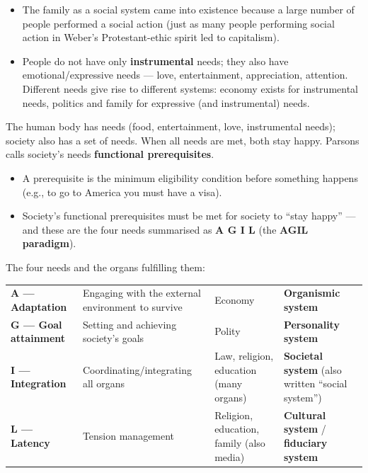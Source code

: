 \begin{ExampleBox}
\begin{itemize}
\item The family as a social system came into existence because a large number of people performed a social action (just as many people performing social action in Weber's Protestant-ethic spirit led to capitalism).
\item People do not have only \textbf{instrumental} needs; they also have emotional/expressive needs --- love, entertainment, appreciation, attention. Different needs give rise to different systems: economy exists for instrumental needs, politics and family for expressive (and instrumental) needs.
\end{itemize}
\end{ExampleBox}

The human body has needs (food, entertainment, love, instrumental needs); society also has a set of needs. When all needs are met, both stay happy. Parsons calls society's needs \textbf{functional prerequisites}.

\begin{KeyConcept}
\begin{itemize}
\item A prerequisite is the minimum eligibility condition before something happens (e.g., to go to America you must have a visa).
\item Society's functional prerequisites must be met for society to ``stay happy'' --- and these are the four needs summarised as \textbf{A G I L} (the \textbf{AGIL paradigm}).
\end{itemize}
\end{KeyConcept}

The four needs and the organs fulfilling them:

\begin{center}
\begin{tabularx}{\textwidth}{p{3.2cm} p{4.2cm} p{3.2cm} Y}
 &  &  &  \\
\midrule
\textbf{A --- Adaptation} & Engaging with the external environment to survive & Economy & \textbf{Organismic system} \\
\textbf{G --- Goal attainment} & Setting and achieving society's goals & Polity & \textbf{Personality system} \\
\textbf{I --- Integration} & Coordinating/integrating all organs & Law, religion, education (many organs) & \textbf{Societal system} (also written ``social system'') \\
\textbf{L --- Latency} & Tension management & Religion, education, family (also media) & \textbf{Cultural system} / \textbf{fiduciary system} \\
\bottomrule
\end{tabularx}
\end{center}

